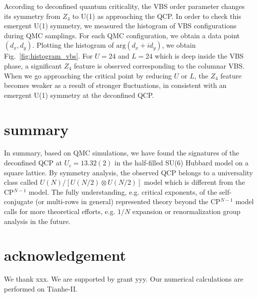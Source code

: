 \documentclass[twocolumn,superscriptaddress]{revtex4-1}
\begin{document}
According to deconfined quantum criticality, the VBS order parameter changes its symmetry from $Z_4$ to U(1) as approaching the QCP. \cite{Senthil2004,*Senthil2004a,*Levin2004} In order to check this emergent U(1) symmetry, we measured the histogram of VBS configurations during QMC samplings. \cite{Sandvik2007} For each QMC configuration, we obtain a data point $(d_x,d_y)$. Plotting the histogram of $\mathrm{arg}(d_x+id_y)$, we obtain Fig.~\ref{fig:histogram_vbs}. For $U=24$ and $L=24$ which is deep inside the VBS phase, a significant $Z_4$ feature is observed corresponding to the columnar VBS. When we go approaching the critical point by reducing $U$ or $L$, the $Z_4$ feature becomes weaker as a result of stronger fluctuations, in consistent with an emergent U(1) symmetry at the deconfined QCP. 



\section{summary}

In summary, based on QMC simulations, we have found the signatures of the deconfined QCP at $U_c=13.32(2)$ in the half-filled SU(6) Hubbard model on a square lattice. By symmetry analysis, the observed QCP belongs to a universality class called $U(N)/[U(N/2)\otimes U(N/2)]$ model which is different from the CP$^{N-1}$ model. The fully understanding, e.g. critical exponents, of the self-conjugate (or multi-rows in general) represented theory beyond the CP$^{N-1}$ model calls for more theoretical efforts, e.g. $1/N$ expansion or renormalization group analysis in the future.

\section{acknowledgement}
We thank xxx.
We are supported by grant yyy.
Our numerical calculations are performed on Tianhe-II. 


\end{document}
